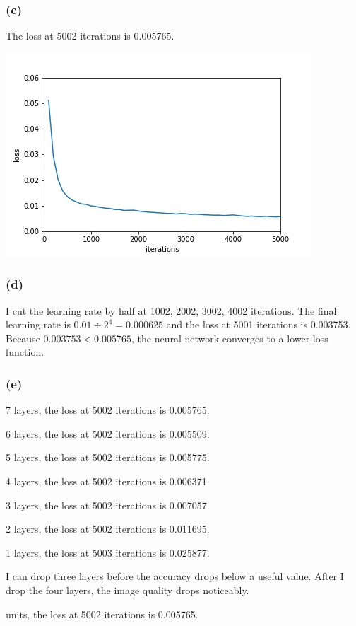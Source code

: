\documentclass[12pt]{article}
\begin{document}
{\subsubsection*{(c)}
The loss at 5002 iterations is 0.005765.

\includegraphics[scale=1]{P3/c.jpg}

\subsubsection*{(d)}
I cut the learning rate by half at 1002, 2002, 3002, 4002 iterations. The final learning rate is $0.01 \div 2^4 = 0.000625$ and the loss at 5001 iterations is 0.003753. Because $0.003753 < 0.005765$, the neural network converges to a lower loss function.

\subsubsection*{(e)}
7 layers, the loss at 5002 iterations is 0.005765.

6 layers, the loss at 5002 iterations is 0.005509.

5 layers, the loss at 5002 iterations is 0.005775.

4 layers, the loss at 5002 iterations is 0.006371.

3 layers, the loss at 5002 iterations is 0.007057.

2 layers, the loss at 5002 iterations is 0.011695.

1 layers, the loss at 5003 iterations is 0.025877.

\medskip
I can drop three layers before the accuracy drops
below a useful value. After I drop the four layers, the image quality drops noticeably.

 units, the loss at 5002 iterations is 0.005765.

}
\end{document}

